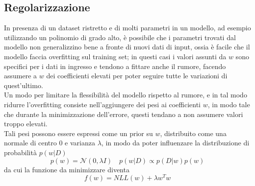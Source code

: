 \documentclass[a4paper,8pt]{article}
\begin{document}
\begin{multicols}{2}
\subsection{Regolarizzazione}
In presenza di un dataset ristretto e di molti parametri in un modello, ad esempio utilizzando un polinomio di grado alto, è possibile che i parametri trovati dal modello non generalizzino bene a fronte di nuovi dati di input, ossia è facile che il modello faccia overfitting sul training set; in questi casi i valori assunti da $w$ sono specifici per i dati in ingresso e tendono a fittare anche il rumore, facendo assumere a $w$ dei coefficienti elevati per poter seguire tutte le variazioni di quest'ultimo.\\
Un modo per limitare la flessibilità del modello rispetto al rumore, e in tal modo ridurre l'overfitting consiste nell'aggiungere dei pesi ai coefficienti $w$, in modo tale che durante la minimizzazione dell'errore, questi tendano a non assumere valori troppo elevati.\\
Tali pesi possono essere espressi come un prior su $w$, distribuito come una normale di centro 0 e varianza $\lambda$, in modo da poter influenzare la distribuzione di probabilità $p(w|D)$
\begin{equation}
p(w) = \mathcal{N}(0, \lambda I) \quad p(w|D) \propto p(D|w)p(w)
\end{equation}
da cui la funzione da minimizzare diventa
\begin{equation}
f(w) = NLL(w) + \lambda w^Tw
\end{equation}

\end{multicols}
\end{document}
